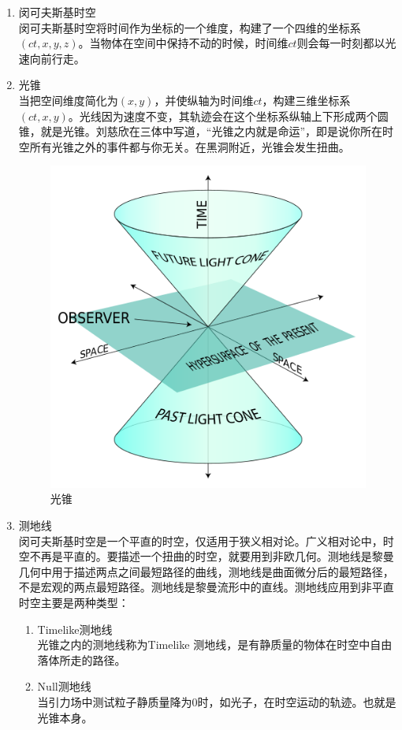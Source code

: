 \begin{enumerate}
    \item 闵可夫斯基时空 \\ 闵可夫斯基时空将时间作为坐标的一个维度，构建了一个四维的坐标系$\left(ct,x,y,z\right)$。当物体在空间中保持不动的时候，时间维$ct$则会每一时刻都以光速向前行走。
    \item 光锥 \\ 当把空间维度简化为$(x,y)$，并使纵轴为时间维$ct$，构建三维坐标系$(ct,x,y)$。光线因为速度不变，其轨迹会在这个坐标系纵轴上下形成两个圆锥，就是光锥。刘慈欣在三体中写道，“光锥之内就是命运”\cite{three-body}，即是说你所在时空所有光锥之外的事件都与你无关。在黑洞附近，光锥会发生扭曲。\begin{figure}[H]
        \centering
        \includegraphics[scale=0.5]{images/light_cone.png}
        \caption{光锥\cite{light_cone}}\label{fig:light_cone} %
    \end{figure}
    
    \item 测地线 \\ 闵可夫斯基时空是一个平直的时空，仅适用于狭义相对论。广义相对论中，时空不再是平直的。要描述一个扭曲的时空，就要用到非欧几何。测地线是黎曼几何中用于描述两点之间最短路径的曲线，测地线是曲面微分后的最短路径，不是宏观的两点最短路径。测地线是黎曼流形中的直线。测地线应用到非平直时空主要是两种类型：
    \begin{enumerate}
        \item Timelike测地线 \\ 光锥之内的测地线称为Timelike 测地线，是有静质量的物体在时空中自由落体所走的路径。
        \item Null测地线 \\ 当引力场中测试粒子静质量降为0时，如光子，在时空运动的轨迹。也就是光锥本身。
    \end{enumerate}
\end{enumerate}



